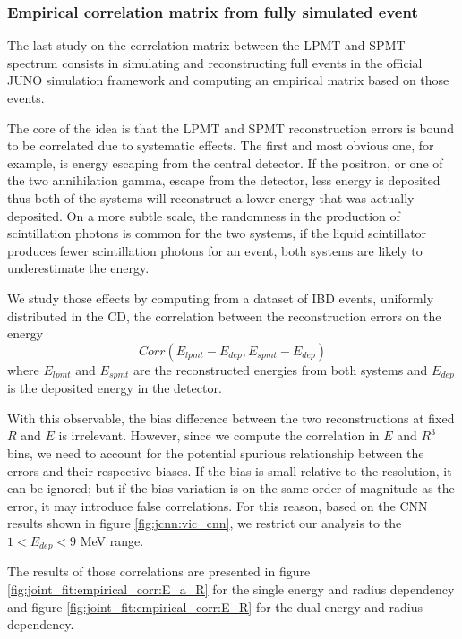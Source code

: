 \documentclass[../main.tex]{subfiles}
\begin{document}
\subsubsection{Empirical correlation matrix from fully simulated event}

The last study on the correlation matrix between the LPMT and SPMT spectrum consists in simulating and reconstructing full events in the official JUNO simulation framework and computing an empirical matrix based on those events.

The core of the idea is that the LPMT and SPMT reconstruction errors is bound to be correlated due to systematic effects. The first and most obvious one, for example, is energy escaping from the central detector. If the positron, or one of the two annihilation gamma, escape from the detector, less energy is deposited thus both of the systems will reconstruct a lower energy that was actually deposited. On a more subtle scale, the randomness in the production of scintillation photons is common for the two systems, if the liquid scintillator produces fewer scintillation photons for an event, both systems are likely to underestimate the energy.

We study those effects by computing from a dataset of IBD events, uniformly distributed in the CD, the correlation between the reconstruction errors on the energy
\begin{equation}
  Corr(E_{lpmt} - E_{dep}, E_{spmt} - E_{dep})
\end{equation}
where $E_{lpmt}$ and $E_{spmt}$ are the reconstructed energies from both systems and $E_{dep}$ is the deposited energy in the detector.

With this observable, the bias difference between the two reconstructions at fixed $R$ and $E$ is irrelevant. However, since we compute the correlation in $E$ and $R^3$ bins, we need to account for the potential spurious relationship between the errors and their respective biases. If the bias is small relative to the resolution, it can be ignored; but if the bias variation is on the same order of magnitude as the error, it may introduce false correlations. For this reason, based on the CNN results shown in figure \ref{fig:jcnn:vic_cnn}, we restrict our analysis to the $1 < E_{dep} < 9$ MeV range.

The results of those correlations are presented in figure \ref{fig:joint_fit:empirical_corr:E_a_R} for the single energy and radius dependency and figure \ref{fig:joint_fit:empirical_corr:E_R} for the dual energy and radius dependency.
\end{document}
